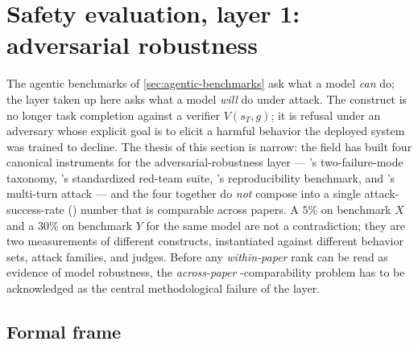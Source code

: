 
\section{Safety evaluation, layer 1: adversarial robustness}
\label{sec:adversarial-robustness}
\label{sec:safety-adversarial-robustness}

The agentic benchmarks of \cref{sec:agentic-benchmarks} ask what a
model \emph{can} do; the layer taken up here asks what a model
\emph{will} do under attack. The construct is no longer task
completion against a verifier $V(s_T, g)$; it is refusal under an
adversary whose explicit goal is to elicit a harmful behavior the
deployed system was trained to decline. The thesis of this section
is narrow: the field has built four canonical instruments for the
adversarial-robustness layer --- \citet{wei2023-jailbroken}'s
two-failure-mode taxonomy, \citet{harmbench2024}'s standardized
red-team suite, \citet{chao2024-jailbreakbench}'s reproducibility
benchmark, and \citet{russinovich2024-crescendo}'s multi-turn attack
--- and the four together do \emph{not} compose into a single
attack-success-rate () number that is comparable across papers.
A $5\%$  on benchmark $X$ and a $30\%$  on benchmark $Y$ for
the same model are not a contradiction; they are two measurements
of different constructs, instantiated against different behavior
sets, attack families, and judges. Before any \emph{within-paper}
 rank can be read as evidence of model robustness, the
\emph{across-paper} -comparability problem has to be acknowledged
as the central methodological failure of the layer.

\subsection{Formal frame}
\label{sec:safety-formal}

